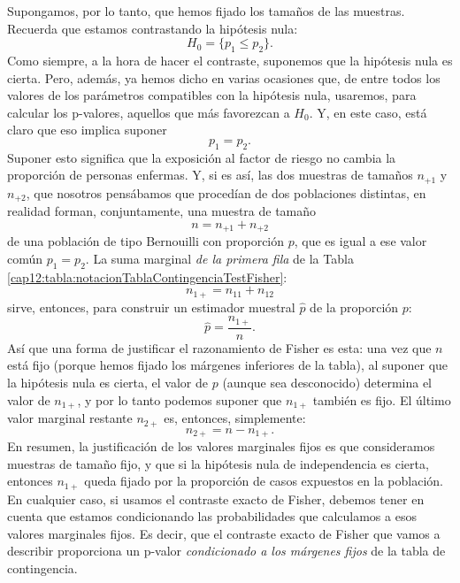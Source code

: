 Supongamos, por lo tanto, que hemos fijado los tamaños de las muestras. Recuerda que estamos contrastando la hipótesis nula:
      \[H_0=\{p_1\leq p_2\}.\]
Como siempre, a la hora de hacer el contraste, suponemos que la hipótesis nula es cierta.  Pero, además, ya hemos dicho en varias ocasiones que, de entre todos los valores de los parámetros compatibles con la hipótesis nula, usaremos, para calcular los p-valores, aquellos que más favorezcan a $H_0$. Y, en este caso, está claro que eso implica suponer
      \[p_1=p_2.\]
Suponer esto significa que la exposición al factor de riesgo no cambia la proporción de personas enfermas. Y, si es así, las dos muestras de tamaños $n_{+1}$ y $n_{+2}$, que nosotros pensábamos que procedían de dos poblaciones distintas, en realidad forman, conjuntamente, una muestra de tamaño
\[n = n_{+1} + n_{+2}\]
de una población de tipo Bernouilli con proporción $p$, que es igual a ese valor común $p_1=p_2$. La suma marginal {\em de la primera fila} de la Tabla \ref{cap12:tabla:notacionTablaContingenciaTestFisher}:
\[n_{1+}=n_{11}+n_{12}\]
sirve, entonces, para construir un estimador muestral $\hat p$ de la proporción $p$:
\[\hat p=\dfrac{n_{1+}}{n}.\]
Así que una forma de justificar el razonamiento de Fisher es esta: una vez que $n$ está fijo (porque hemos fijado los márgenes inferiores de la tabla), al suponer que la hipótesis nula es cierta, el valor de $p$ (aunque sea desconocido) determina el valor de $n_{1+}$, y por lo tanto podemos suponer que $n_{1+}$ también es fijo. El último valor marginal restante $n_{2+}$ es, entonces, simplemente:
\[n_{2+}=n-n_{1+}.\]
En resumen, la justificación de los valores marginales fijos es que consideramos muestras de tamaño fijo, y que si la hipótesis nula de independencia es cierta, entonces $n_{1+}$ queda fijado por la proporción de casos expuestos en la población. En cualquier caso, si usamos el contraste exacto de Fisher, debemos tener en cuenta que estamos condicionando las probabilidades que calculamos a esos valores marginales fijos. Es decir, que el contraste exacto de Fisher que vamos a describir proporciona un p-valor {\em condicionado a los márgenes fijos} de la tabla de contingencia.

